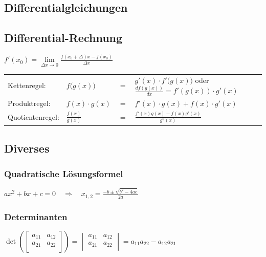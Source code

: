 	\subsection{Differentialgleichungen}
		
	\subsection{Differential-Rechnung}
	  $f'(x_0)=\lim\limits_{\Delta x\rightarrow 0}
	  \frac{f(x_0+\Delta)x-f(x_0)}{\Delta x}$\\
		\begin{tabular}{llll}
			Kettenregel:	& $f\big(g(x)\big)$ &$=$ & $g'(x)\cdot f'\big(g(x)\big)$
			oder $\frac{d f(g(x))}{dx} = f'(g(x)) \cdot g'(x)$\\[0.1cm] Produktregel:	&
			$f(x)\cdot g(x)$ &$=$ & $f'(x)\cdot g(x) + f(x)\cdot g'(x)$\\[0.1cm] Quotientenregel:& $\frac{f(x)}{g(x)}$ &$=$ & $\frac{f'(x)g(x)-f(x)g'(x)}{g^2(x)}$\\
		\end{tabular}
		
	\subsection{Diverses}	
	\begin{minipage}[t]{9.5cm}
		\subsubsection{Quadratische Lösungsformel}
			$ax^2+bx+c=0\quad\Rightarrow\quad x_{1,2}=\frac{-b\pm\sqrt{b^2-4ac}}{2a}$
	\end{minipage}
	\hfill
	\begin{minipage}[t]{9.5cm}
		\subsubsection{Determinanten}
			$\det\left(
			\begin{bmatrix}
				a_{11}&a_{12}\\
				a_{21}&a_{22}\\
			\end{bmatrix}\right)=
			\begin{vmatrix}
				a_{11}&a_{12}\\
				a_{21}&a_{22}\\
			\end{vmatrix}=a_{11}a_{22}-a_{12}a_{21}$
	\end{minipage}\\
	
